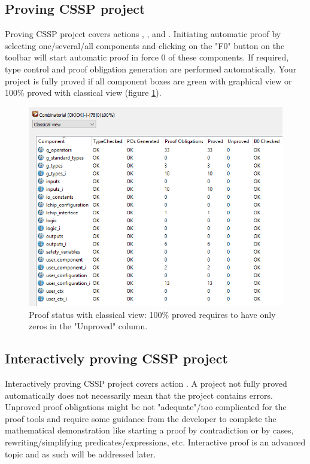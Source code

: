 \subsection{Proving CSSP project}

Proving CSSP project covers actions , , and . Initiating automatic proof by selecting one/several/all components and clicking on the "F0" button on the toolbar will start automatic proof in force 0 of these components. If required, type control and proof obligation generation are performed automatically. Your project is fully proved if all component boxes are green with graphical view or 100\% proved with classical view (figure \ref{programming:proof-status-classical}).

  \begin{figure}[ht]
\centering\includegraphics[scale=0.4]{Pictures/chapterProgramming/project-status-classical.png}
\caption{Proof status with classical view: 100\% proved requires to have only zeros in the "Unproved" column.}
\label{programming:proof-status-classical}
\end{figure}  

\subsection{Interactively proving  CSSP project}

Interactively proving CSSP project covers action . A project not fully proved automatically does not necessarily mean that the project contains errors. Unproved proof obligations might be not "adequate"/too complicated for the proof tools and require some guidance from the developer to complete the mathematical demonstration like starting a proof by contradiction or by cases, rewriting/simplifying predicates/expressions, etc. Interactive proof is an advanced topic and as such will be addressed later. 

